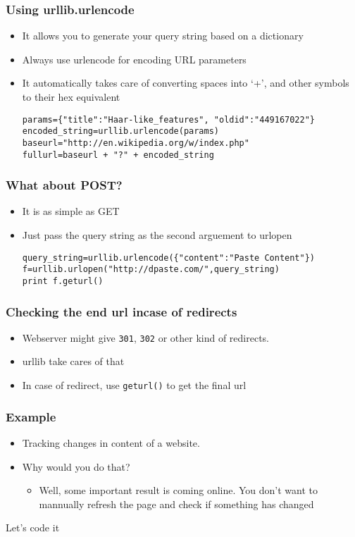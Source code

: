 \documentclass{beamer}
\begin{document}
\begin{frame}[fragile]
\frametitle{Using urllib.urlencode}
\label{sec-3_5}


\begin{itemize}
\item It allows you to generate your query string based on a dictionary
\item Always use urlencode for encoding URL parameters
\item It automatically takes care of converting spaces into `+', and other symbols to their hex equivalent

\begin{verbatim}
params={"title":"Haar-like_features", "oldid":"449167022"}
encoded_string=urllib.urlencode(params)
baseurl="http://en.wikipedia.org/w/index.php"
fullurl=baseurl + "?" + encoded_string
\end{verbatim}
\end{itemize}
\end{frame}
\begin{frame}[fragile]
\frametitle{What about POST?}
\label{sec-3_6}


\begin{itemize}
\item It is as simple as GET
\item Just pass the query string as the second arguement to urlopen
     
\begin{verbatim}
query_string=urllib.urlencode({"content":"Paste Content"})
f=urllib.urlopen("http://dpaste.com/",query_string)
print f.geturl()
\end{verbatim}
\end{itemize}
\end{frame}
\begin{frame}
\frametitle{Checking the end url incase of redirects}
\label{sec-3_7}


\begin{itemize}
\item Webserver might give \texttt{301}, \texttt{302} or other kind of redirects.
\item urllib take cares of that
\item In case of redirect, use \texttt{geturl()} to get the final url
\end{itemize}
\end{frame}
\begin{frame}
\frametitle{Example}
\label{sec-3_8}


\begin{itemize}
\item Tracking changes in content of a website.
\item Why would you do that?
\begin{itemize}
\item Well, some important result is coming online. You don't want to mannually refresh the page and check if something has changed
\end{itemize}
\end{itemize}
   Let's code it
\end{frame}
\end{document}
